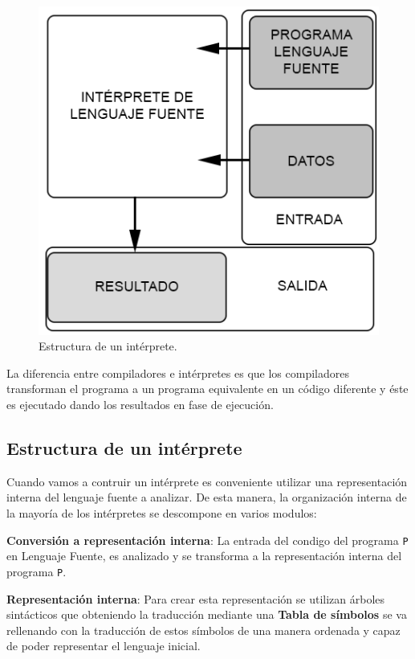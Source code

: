 \documentclass{article}
\begin{document}
    \begin{figure}[H]
        \centering
        \includegraphics[scale = 0.6]{imagesMem/interprete.png}
        \caption{Estructura de un intérprete.}

    \end{figure}

    La diferencia entre compiladores e intérpretes es que los compiladores transforman el programa a un programa equivalente
    en un código diferente y éste es ejecutado dando los resultados en fase de ejecución.

    \subsection{Estructura de un intérprete}

    Cuando vamos a contruir un intérprete es conveniente utilizar una representación interna del lenguaje fuente a analizar.
    De esta manera, la organización interna de la mayoría de los intérpretes se descompone en varios modulos:

    \textbf{Conversión a representación interna}: La entrada del condigo del programa \texttt{P} en Lenguaje Fuente, es
    analizado y se transforma a la representación interna del programa \texttt{P}.

    \textbf{Representación interna}: Para crear esta representación se utilizan árboles sintácticos que obteniendo la traducción
    mediante una \textbf{Tabla de símbolos } se va rellenando con la traducción de estos símbolos de una manera ordenada
    y capaz de poder representar el lenguaje inicial.
\end{document}
